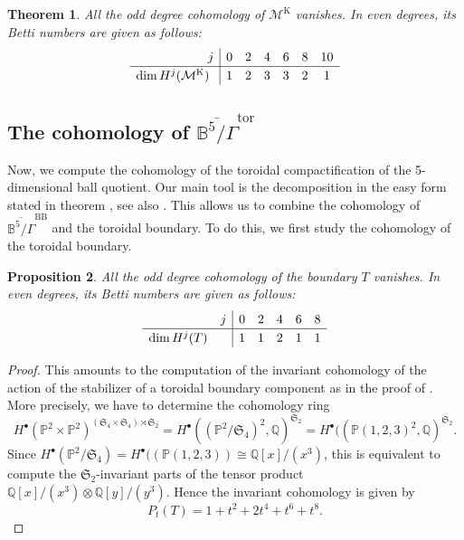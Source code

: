 \documentclass[12pt, pdftex]{amsart}
\theoremstyle{plain}
\newtheorem{thm}{Theorem}[section]
\newtheorem{prop}[thm]{Proposition}
\theoremstyle{definition}
\numberwithin{equation}{section}
\def\Q{{\mathbb Q}}
\def\P{{\mathbb P}}
\def\B{{\mathbb B}}
\def\SS{{\mathfrak S}}
\def\dim{\mathop{\mathrm{dim}}\nolimits}
\def\K{\mathrm{K}}
\def\tor{\mathrm{tor}}
\def\BB{\mathrm{BB}}
\def\M{\mathcal{M}}
\begin{document}
\begin{thm}
\label{thm:coh_M^K}
All the odd degree cohomology of $\M^{\K}$ vanishes.
In even degrees, its Betti numbers are given as follows:
\begin{align*}
\renewcommand*{\arraystretch}{1.2}
\begin{array}{l|cccccc}
\hskip2cm j&0&2&4&6&8&10\\\hline
\dim H^j(\M^{\K})&1&2&3&3&2&1\\
\end{array}
\end{align*}
\end{thm}


\subsection{The cohomology of $\overline{\B^5/\Gamma}^{\tor}$}
Now, we compute the cohomology of the toroidal compactification of the 5-dimensional ball quotient.
Our main tool is the decomposition in the easy form stated in theorem \cite[Lemma 9.1]{GH17}, see also \cite[chapter 6]{CMGHL19}.
This allows us to combine the cohomology of $\overline{\B^5/\Gamma}^{\BB}$ and the toroidal boundary.
To do this, we first study the cohomology of the toroidal boundary.

\begin{prop}
\label{prop:coh_boundary}
All the odd degree cohomology of the boundary $T$ vanishes.
In even degrees, its Betti numbers are given as follows:
\begin{align*}
\renewcommand*{\arraystretch}{1.2}
\begin{array}{l|ccccc}
\hskip2cm j&0&2&4&6&8\\\hline
\dim H^j(T)&1&1&2&1&1\\
\end{array}
\end{align*}
\end{prop}

\begin{proof}
This amounts to the computation of the invariant cohomology of the action of the stabilizer of a toroidal boundary component as in the proof of \cite[Proposition 7.13]{CMGHL19}.
More precisely, we have to determine the cohomology ring 
\[
 H^{\bullet}(\P^2 \times \P^2)^{(\SS_4\times\SS_4)\rtimes\SS_2} = H^{\bullet}((\P^2/\SS_4)^2, \Q)^{\SS_2} = H^{\bullet}((\P(1,2,3)^2, \Q)^{\SS_2} .
\]
Since $H^{\bullet}(\P^2/\SS_4) =   H^{\bullet}((\P(1,2,3))  \cong \Q[x]/(x^3)$, this is equivalent to compute the $\SS_2$-invariant parts of the tensor product $\Q[x]/(x^3)\otimes\Q[y]/(y^3)$.
Hence the invariant cohomology is given by 
\[P_t(T)=1+t^2+2t^4+t^6+t^8.\]
\end{proof}
\end{document}
